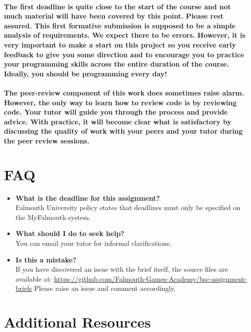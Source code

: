 \documentclass{../../fal_assignment}
\begin{document}
\paragraph{The first deadline is quite close to the start of the course and not much material will have been covered by this point. Please rest assured. This first formative submission is supposed to be a simple analysis of requirements. We expect there to be errors. However, it is very important to make a start on this project so you receive early feedback to give you some direction and to encourage you to practice your programming skills across the entire duration of the course. Ideally, you should be programming every day!}

\paragraph{The peer-review component of this work does sometimes raise alarm. However, the only way to learn how to review code is by reviewing code. Your tutor will guide you through the process and provide advice. With practice, it will become clear what is satisfactory by discussing the quality of work with your peers and your tutor during the peer review sessions.} 

\section*{FAQ}

\begin{itemize}
	\item 	\textbf{What is the deadline for this assignment?} \\ 
    		Falmouth University policy states that deadlines must only be specified on the MyFalmouth system.
    		
	\item 	\textbf{What should I do to seek help?} \\ 
    		You can email your tutor for informal clarifications.
    		
    	\item 	\textbf{Is this a mistake?} \\ 	
    		If you have discovered an issue with the brief itself, the source files are available at:
    		\url{https://github.com/Falmouth-Games-Academy/bsc-assignment-briefs}
    		 Please raise an issue and comment accordingly.
\end{itemize}

\section*{Additional Resources}
\end{document}
